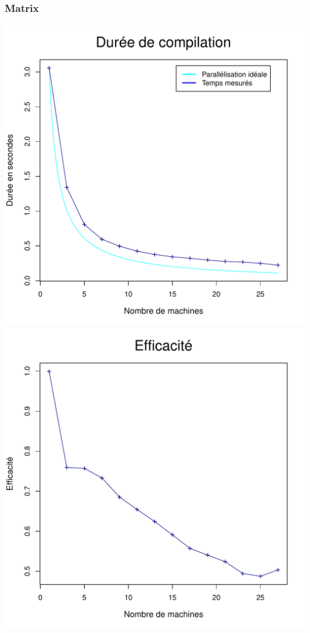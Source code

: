 \documentclass[a4paper, 11pt, titlepage]{article}
\begin{document}
\subsubsection {Matrix}

\begin{center}
    \includegraphics[scale=0.45]{res/sujet_makefiles_matrix_Makefile_nth1.pdf}
    \includegraphics[scale=0.45]{res/sujet_makefiles_matrix_Makefile_nth1_eff.pdf}

\end{center}
\end{document}
